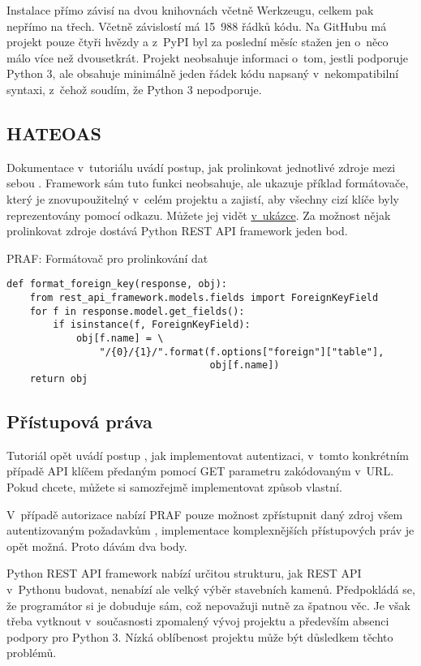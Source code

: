 Instalace přímo závisí na dvou knihovnách včetně Werkzeugu, celkem pak nepřímo na třech. Včetně závislostí má 15~988 řádků kódu. Na GitHubu má projekt pouze čtyři hvězdy a z~PyPI byl za poslední měsíc stažen jen o~něco málo více než dvousetkrát. Projekt neobsahuje informaci o~tom, jestli podporuje Python 3, ale obsahuje minimálně jeden řádek kódu napsaný v~nekompatibilní syntaxi, z~čehož soudím, že Python 3 nepodporuje.

\subsection{HATEOAS}\label{hateoas}

Dokumentace v~tutoriálu uvádí postup, jak prolinkovat jednotlivé zdroje mezi sebou \autocite{praflink1}\autocite{praflink2}. Framework sám tuto funkci neobsahuje, ale ukazuje příklad formátovače, který je znovupoužitelný v~celém projektu a zajistí, aby všechny cizí klíče byly reprezentovány pomocí odkazu. Můžete jej vidět \protect\hyperlink{code:praflink}{v~ukázce}. Za možnost nějak prolinkovat zdroje dostává Python REST API framework jeden bod.

\begin{listing}[htbp]
\caption{{\label{code:praflink}PRAF: Formátovač pro prolinkování dat \autocite{praflink2}}}
\begin{verbatim}
def format_foreign_key(response, obj):
    from rest_api_framework.models.fields import ForeignKeyField
    for f in response.model.get_fields():
        if isinstance(f, ForeignKeyField):
            obj[f.name] = \
                "/{0}/{1}/".format(f.options["foreign"]["table"],
                                   obj[f.name])
    return obj
\end{verbatim}
\end{listing}

\subsection{Přístupová práva}\label{pux159uxedstupovuxe1-pruxe1va}

Tutoriál opět uvádí postup \autocite{prafauth}, jak implementovat autentizaci, v~tomto konkrétním případě API klíčem předaným pomocí GET parametru zakódovaným v~URL. Pokud chcete, můžete si samozřejmě implementovat způsob vlastní.

V~případě autorizace nabízí PRAF pouze možnost zpřístupnit daný zdroj všem autentizovaným požadavkům \autocite{prafauth}, implementace komplexnějších přístupových práv je opět možná. Proto dávám dva body.

Python REST API framework nabízí určitou strukturu, jak REST API v~Pythonu budovat, nenabízí ale velký výběr stavebních kamenů. Předpokládá se, že programátor si je dobuduje sám, což nepovažuji nutně za špatnou věc. Je však třeba vytknout v~současnosti zpomalený vývoj projektu a především absenci podpory pro Python 3. Nízká oblíbenost projektu může být důsledkem těchto problémů.
